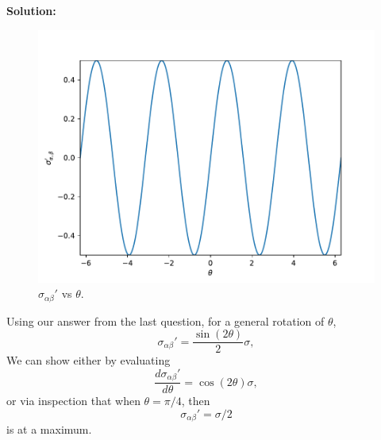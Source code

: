 \documentclass[12pt]{article}
\begin{document}
\begin{itemize}
	      \textbf{Solution:}
	      \begin{figure}[h]
		      \centering
		      \includegraphics[width=0.7\linewidth]{images/sin}
		      \caption{$\sigma_{\alpha\beta}'$ vs $\theta$.}
		      \label{fig:sin}
	      \end{figure}

	      Using our answer from the last question, for a general rotation of $\theta$,
	      \begin{equation}
		      \sigma_{\alpha\beta}' = \frac{\sin(2\theta)}{2} \sigma,
	      \end{equation}
	      We can show either by evaluating
	      \begin{equation}
		      \frac{d\sigma_{\alpha\beta}'}{d \theta} = \cos(2 \theta) \sigma,
	      \end{equation}
	      or via inspection that when $\theta = \pi / 4$, then
	      \begin{equation}
		      \sigma_{\alpha\beta}' = \sigma / 2
	      \end{equation}
	      is at a maximum.
\end{itemize}
\end{document}
